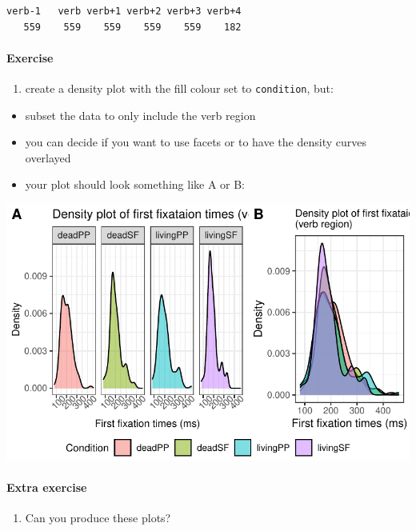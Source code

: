 \documentclass[
  letterpaper,
  DIV=11,
  numbers=noendperiod]{scrartcl}
\let\oldparagraph\paragraph
\renewcommand{\paragraph}[1]{\oldparagraph{#1}\mbox{}}
\providecommand{\tightlist}{%
  \setlength{\itemsep}{0pt}\setlength{\parskip}{0pt}}\usepackage{longtable,booktabs,array}
\begin{document}
\begin{verbatim}
verb-1   verb verb+1 verb+2 verb+3 verb+4 
   559    559    559    559    559    182 
\end{verbatim}

\hypertarget{exercise-1}{%
\paragraph{Exercise}\label{exercise-1}}

\begin{enumerate}
\def\labelenumi{\arabic{enumi}.}
\tightlist
\item
  create a density plot with the fill colour set to \texttt{condition},
  but:
\end{enumerate}

\begin{itemize}
\tightlist
\item
  subset the data to only include the verb region
\item
  you can decide if you want to use facets or to have the density curves
  overlayed
\item
  your plot should look something like A or B:
\end{itemize}

\includegraphics{_data_viz_files/figure-pdf/unnamed-chunk-22-1.pdf}

\hypertarget{extra-exercise}{%
\paragraph{Extra exercise}\label{extra-exercise}}

\begin{enumerate}
\def\labelenumi{\arabic{enumi}.}
\setcounter{enumi}{1}
\tightlist
\item
  Can you produce these plots?
\end{enumerate}
\end{document}
